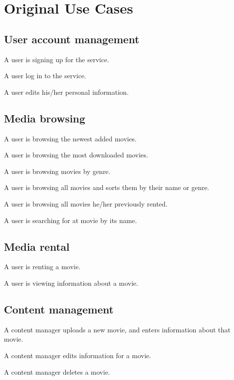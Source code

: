 \chapter{Original Use Cases}
\label{Appendix_OUC}

\section{User account management}
\label{Appendix_OUC_UAM}
\begin{my_itemize}
\item A user is signing up for the service.
\item A user log in to the service.
\item A user edits his/her personal information.
\end{my_itemize}
\section{Media browsing}
\label{Appendix_OUC_MB}
\begin{my_itemize}
\item A user is browsing the newest added movies.
\item A user is browsing the most downloaded movies.
\item A user is browsing movies by genre.
\item A user is browsing all movies and sorts them by their name or genre.
\item A user is browsing all movies he/her previously rented.
\item A user is searching for at movie by its name.
\end{my_itemize}
\section{Media rental}
\label{Appendix_OUC_MR}
\begin{my_itemize}
\item A user is renting a movie.
\item A user is viewing information about a movie.
\end{my_itemize}
\section{Content management}
\label{Appendix_OUC_CM}
\begin{my_itemize}
\item A content manager uploads a new movie, and enters information about that movie.
\item A content manager edits information for a movie.
\item A content manager deletes a movie.
\end{my_itemize}
